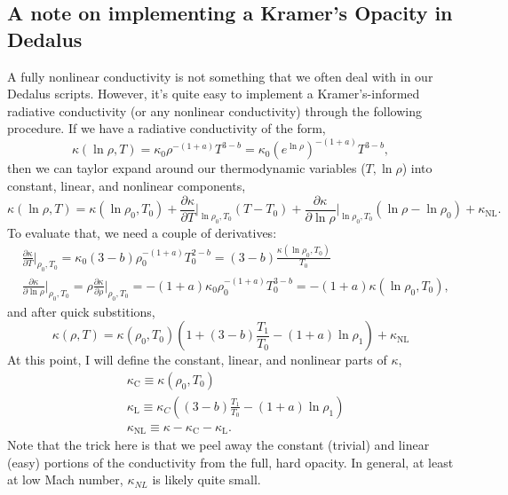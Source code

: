 \subsection{A note on implementing a Kramer's Opacity in Dedalus}
A fully nonlinear conductivity is not something that we often deal with in our Dedalus scripts.
However, it's quite easy to implement a Kramer's-informed radiative conductivity (or any nonlinear conductivity) through the following procedure.
If we have a radiative conductivity of the form,
\begin{equation}
\kappa(\ln\rho, T) = \kappa_0 \rho^{-(1 + a)} T^{3 - b}
= \kappa_0 \left(e^{\ln\rho}\right)^{-(1 + a)} T^{3 - b},
\end{equation}
then we can taylor expand around our thermodynamic variables ($T, \ln\rho$) into constant, linear, and nonlinear components,
\begin{equation}
\kappa(\ln\rho, T) = \kappa(\ln\rho_0, T_0) 
+ \frac{\partial \kappa}{\partial T}\bigg|_{\ln\rho_0, T_0}(T - T_0)
+ \frac{\partial \kappa}{\partial \ln\rho}\bigg|_{\ln\rho_0, T_0}(\ln\rho - \ln\rho_0)
+ \kappa_{\text{NL}}.
\end{equation}
To evaluate that, we need a couple of derivatives:
\begin{equation}
\begin{split}
&\frac{\partial \kappa}{\partial T}\bigg|_{\rho_0, T_0} = 
\kappa_0(3-b)\rho_0^{-(1+a)}T_0^{2-b} = (3-b)\frac{\kappa(\ln\rho_0, T_0)}{T_0} \\
&\frac{\partial \kappa}{\partial \ln\rho}\bigg|_{\rho_0, T_0} =
\rho\frac{\partial \kappa}{\partial \rho}\bigg|_{\rho_0, T_0} =
-(1+a)\kappa_0 \rho_0^{-(1+a)} T_0^{3-b} = -(1+a)\kappa(\ln\rho_0, T_0),
\end{split}
\end{equation}
and after quick substitions,
\begin{equation}
\kappa(\rho, T) = \kappa(\rho_0, T_0)\left( 1 +
(3 - b)\frac{T_1}{T_0} - (1 + a) \ln\rho_1 \right)
+ \kappa_{\text{NL}}
\end{equation}
At this point, I will define the constant, linear, and nonlinear parts of $\kappa$,
\begin{equation}
\begin{split}
&\kappa_\text{C} \equiv \kappa(\rho_0, T_0) \\
&\kappa_\text{L} \equiv \kappa_C\left(
(3 - b)\frac{T_1}{T_0} - (1 + a) \ln\rho_1 \right) \\
&\kappa_{\text{NL}} \equiv \kappa - \kappa_\text{C} - \kappa_{\text{L}}.
\end{split}
\end{equation}
Note that the trick here is that we peel away the constant (trivial) and linear (easy) portions of the conductivity from the full, hard opacity.
In general, at least at low Mach number, $\kappa_{NL}$ is likely quite small.


